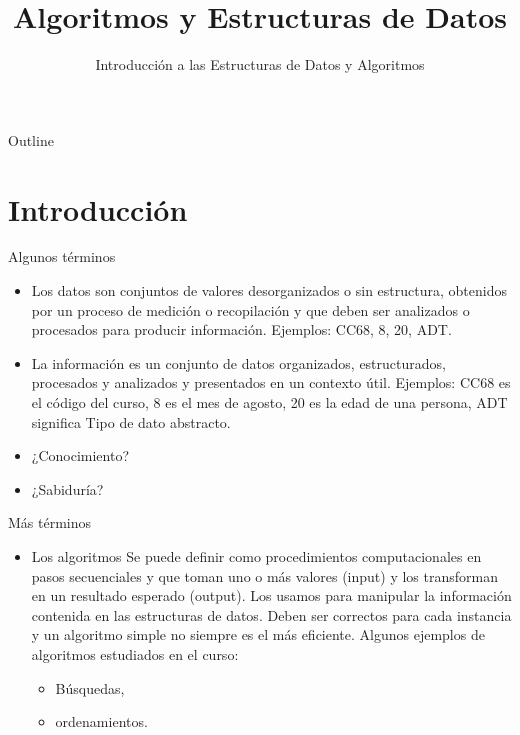 \documentclass[aspectratio=169]{beamer}
\title{Algoritmos y Estructuras de Datos}
\subtitle{Introducción a las Estructuras de Datos y Algoritmos}
\date{\the\year}
\institute{\href{http://www.upc.edu.pe}{Universidad Peruana de Ciencias Aplicadas}}
\begin{document}
\maketitle

\begin{frame}{Outline}
  \tableofcontents
\end{frame}

\section{Introducción}

\begin{frame}{Algunos términos}

  \begin{itemize}
    \item Los \alert{datos} son conjuntos de valores desorganizados o sin estructura, obtenidos por un proceso de medición o recopilación y que deben ser analizados o procesados para producir información. Ejemplos: CC68, 8, 20, ADT.
    \item La \alert{información} es un conjunto de datos organizados, estructurados, procesados y analizados y presentados en un contexto útil. Ejemplos: CC68 es el código del curso, 8 es el mes de agosto, 20 es la edad de una persona, ADT significa Tipo de dato abstracto.
    \item ¿Conocimiento?
    \item ¿Sabiduría?
  \end{itemize}

\end{frame}

\begin{frame}{Más términos}

  \begin{itemize}
    \item Los \alert{algoritmos} Se puede definir como procedimientos computacionales en pasos secuenciales y que toman uno o más valores (input) y los transforman en un resultado esperado (output). Los usamos para manipular la información contenida en las estructuras de datos. Deben ser correctos para cada instancia y un algoritmo simple no siempre es el más eficiente. Algunos ejemplos de algoritmos estudiados en el curso:
    \begin{itemize}
      \item Búsquedas,
      \item ordenamientos.
    \end{itemize}
  \end{itemize}

\end{frame}
\end{document}
